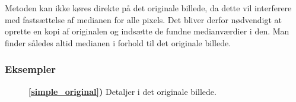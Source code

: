 {Metoden kan ikke køres direkte på det originale billede, da dette
vil interferere med fastsættelse af medianen for alle pixels. Det bliver
derfor nødvendigt at oprette en kopi af originalen og indsætte de fundne
medianværdier i den. Man finder således altid medianen i forhold til det
originale billede.

\subsubsection*{Eksempler}

\begin{figure}[!h]
    \centering
    \hspace{1em}
    \hspace{1em}
    \caption[]{
        \textbf{\ref{simple_original})} Detaljer i det originale
        billede.
}
\end{figure}}
